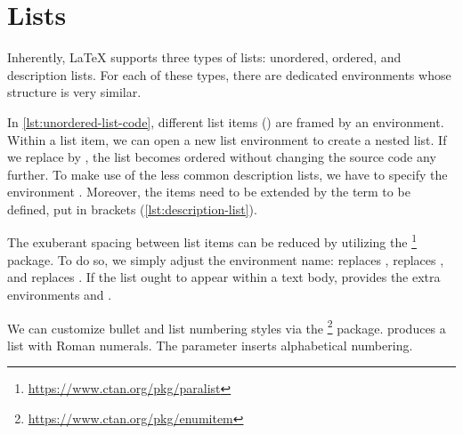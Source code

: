 \chapter{Lists}
\label{sec:lists}

Inherently, \LaTeX{} supports three types of lists: unordered, ordered, and description lists.
For each of these types, there are dedicated environments whose structure is very similar.


In \cref{lst:unordered-list-code}, different list items () are framed by an  environment.
Within a list item, we can open a new list environment to create a nested list.
If we replace  by , the list becomes ordered without changing the source code any further.
To make use of the less common description lists, we have to specify the environment .
Moreover, the items need to be extended by the term to be defined, put in brackets (\cref{lst:description-list}).


The exuberant spacing between list items can be reduced by utilizing the \footnote{\url{https://www.ctan.org/pkg/paralist}} package.
To do so, we simply adjust the environment name:  replaces ,  replaces , and  replaces .
If the list ought to appear within a text body,  provides the extra environments  and .

We can customize bullet and list numbering styles via the \footnote{\url{https://www.ctan.org/pkg/enumitem}} package.
 produces a list with Roman numerals. 
The parameter  inserts alphabetical numbering.
